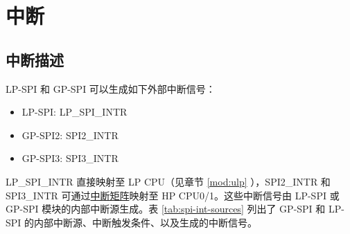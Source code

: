 \documentclass[main\_\_CN.tex]{subfiles}
\begin{document}
\section{中断}
\label{sec:spi-interrupt}
\subsection{中断描述}

\chipname{} LP-SPI 和 GP-SPI 可以生成如下外部中断信号：
\begin{itemize}
    \item LP-SPI: LP\_SPI\_INTR
    \item GP-SPI2: SPI2\_INTR
    \item GP-SPI3: SPI3\_INTR
\end{itemize}

LP\_SPI\_INTR 直接映射至 LP CPU（见章节 \ref{mod:ulp} \textit{}），SPI2\_INTR 和 SPI3\_INTR 可通过\hyperref[mod:intmtrx]{中断矩阵}映射至 HP CPU0/1。这些中断信号由 LP-SPI 或 GP-SPI 模块的内部中断源生成。表 \ref{tab:spi-int-sources} 列出了 GP-SPI 和 LP-SPI 的内部中断源、中断触发条件、以及生成的中断信号。
\end{document}
